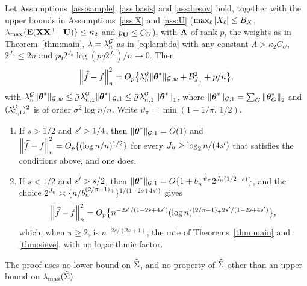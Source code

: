 

\begin{proposition}
\label{prop:slow}
Let Assumptions~\ref{ass:sample}, \ref{ass:basis} and \ref{ass:besov} hold,
together with the upper bounds in Assumptions~\ref{ass:X} and \ref{ass:U}
($\max_{\ell}|X_{\ell}| \le B_X$, $\lambda_{\max}\{\mathrm{E}(\mathbf{X}\mathbf{X}^{\top}\mid\mathbf{U})\} \le \kappa_2$ and
$p_{\mathbf{U}} \le C_U$), with $\mathbf{A}$ of rank $p$, the weights as in
Theorem~\ref{thm:main}, $\lambda = \lambda^{\mathcal{G}}_{n}$ as in \eqref{eq:lambda} with any constant
$\Lambda > \kappa_2C_U$, $2^{J_n} \le 2n$ and
$pq2^{J_n}\log(pq2^{J_n})/n \to 0$. Then
\[
  \left\lVert \widehat{f}-f \right\rVert_{n}^{2} = O_p\bigl\{\lambda^{\mathcal{G}}_{n}\lVert \boldsymbol{\theta}^{*}\rVert_{\mathcal{G},w} +
  \mathcal{B}_{J_n}^{2} + p/n\bigr\},
\]
with $\lambda^{\mathcal{G}}_{n}\lVert \boldsymbol{\theta}^{*}\rVert_{\mathcal{G},w} \le \bar\varrho\,\lambda^{\mathcal{G}}_{n,1}\lVert \boldsymbol{\theta}^{*}\rVert_{\mathcal{G},1}
\le \bar\varrho\,\lambda^{\mathcal{G}}_{n,1}\left\lVert \boldsymbol{\theta}^{*} \right\rVert_{1}$, where $\lVert \boldsymbol{\theta}^{*}\rVert_{\mathcal{G},1} = \sum_{G}\left\lVert \boldsymbol{\theta}^{*}_{G} \right\rVert_{2}$ and
$(\lambda^{\mathcal{G}}_{n,1})^{2}$ is of order $\sigma^{2}\log n/n$. Write
$\vartheta_\pi = \min(1-1/\pi,\,1/2)$.
\begin{enumerate}
\item[(i)] If $s > 1/2$ and $s' > 1/4$, then $\lVert \boldsymbol{\theta}^{*}\rVert_{\mathcal{G},1} = O(1)$
and $\left\lVert \widehat{f}-f \right\rVert_{n}^{2} = O_p\{(\log n/n)^{1/2}\}$ for every
$J_n \ge \log_2 n/(4s')$ that satisfies the conditions above, and one
does.
\item[(ii)] If $s < 1/2$ and $s' > s/2$, then
$\lVert \boldsymbol{\theta}^{*}\rVert_{\mathcal{G},1} = O\{1 + b_{n}^{-\vartheta_\pi}2^{J_n(1/2-s)}\}$, and the
choice $2^{J_n} \asymp \{n/b_{n}^{(2/\pi-1)_{+}}\}^{1/(1-2s+4s')}$ gives
\[
  \left\lVert \widehat{f}-f \right\rVert_{n}^{2}
  = O_p\bigl\{n^{-2s'/(1-2s+4s')}
  (\log n)^{(2/\pi-1)_{+}2s'/(1-2s+4s')}\bigr\} ,
\]
which, when $\pi \ge 2$, is $n^{-2s/(2s+1)}$, the rate of
Theorems~\ref{thm:main} and \ref{thm:sieve}, with no logarithmic factor.
\end{enumerate}
The proof uses no lower bound on $\widehat{\Sigma}$, and no property of $\widehat{\Sigma}$
other than  an upper bound on
$\lambda_{\max}(\widehat{\Sigma})$.
\end{proposition}



